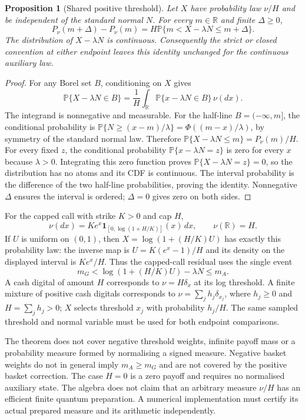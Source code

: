 \documentclass[11pt,a4paper]{article}
\newtheorem{proposition}{Proposition}[section]
\newcommand{\Prb}{\mathbb P}
\newcommand{\ind}{\mathbf 1}
\begin{document}
\begin{proposition}[Shared positive threshold]
\label{prop:general-threshold}
Let $X$ have probability law $\nu/H$ and be independent of the standard
normal $N$. For every $m\in\mathbb R$ and finite $\Delta\ge0$,
\[
 P_\nu(m+\Delta)-P_\nu(m)
 =H\Prb\{m<X-\lambda N\le m+\Delta\}.
\]
The distribution of $X-\lambda N$ is continuous. Consequently the strict
or closed convention at either endpoint leaves this identity unchanged for
the continuous auxiliary law.
\end{proposition}
\begin{proof}
For any Borel set $B$, conditioning on $X$ gives
\[
 \Prb\{X-\lambda N\in B\}
 =\frac1H\int_{\mathbb R}\Prb\{x-\lambda N\in B\}\,\nu(dx).
\]
The integrand is nonnegative and measurable. For the half-line
$B=(-\infty,m]$, the conditional probability is
$\Prb\{N\ge(x-m)/\lambda\}=\Phi((m-x)/\lambda)$, by symmetry of the
standard normal law. Therefore
$\Prb\{X-\lambda N\le m\}=P_\nu(m)/H$.
For every fixed $z$, the conditional probability
$\Prb\{x-\lambda N=z\}$ is zero for every $x$ because $\lambda>0$.
Integrating this zero function proves
$\Prb\{X-\lambda N=z\}=0$, so the distribution has no atoms and its
CDF is continuous. The interval probability is the difference of the two
half-line probabilities, proving the identity. Nonnegative $\Delta$
ensures the interval is ordered; $\Delta=0$ gives zero on both sides.
\end{proof}

For the capped call with strike $K>0$ and cap $H$,
\[
 \nu(dx)=Ke^x\ind_{[0,\log(1+H/K)]}(x)\,dx,
 \qquad\nu(\mathbb R)=H.
\]
If $U$ is uniform on $(0,1)$, then
$X=\log(1+(H/K)U)$ has exactly this probability law: the inverse map is
$U=K(e^x-1)/H$ and its density on the displayed interval is $Ke^x/H$.
Thus the capped-call residual uses the single event
\[
 m_G<\log(1+(H/K)U)-\lambda N\le m_A.
\]
A cash digital of amount $H$ corresponds to $\nu=H\delta_x$ at its log
threshold. A finite mixture of positive cash digitals corresponds to
$\nu=\sum_jh_j\delta_{x_j}$, where $h_j\ge0$ and
$H=\sum_jh_j>0$; $X$ selects threshold $x_j$ with probability $h_j/H$.
The same sampled threshold and normal variable must be used for both
endpoint comparisons.

The theorem does not cover negative threshold weights, infinite payoff
mass or a probability measure formed by normalising a signed measure.
Negative basket weights do not in general imply $m_A\ge m_G$ and are not
covered by the positive basket correction. The case $H=0$ is a zero
payoff and requires no normalised auxiliary state. The algebra does not
claim that an arbitrary measure $\nu/H$ has an efficient finite quantum
preparation. A numerical implementation must certify its actual prepared
measure and its arithmetic independently.
\end{document}
